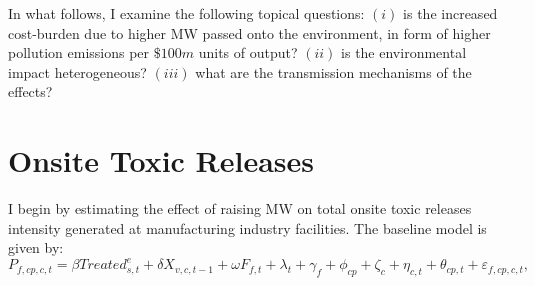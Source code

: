 \documentclass{C:/Users/david/OneDrive/Documents/ULMS/PhD/Thesis/chapter3/src/climate_change/latex/Economic_Journal/OUP-EJ}
\begin{document}
    In what follows, I examine the following topical questions: $(i)$ is the increased cost-burden due to higher MW passed onto the environment, in form of higher pollution emissions per $\$100m$ units of output? $(ii)$ is the environmental impact heterogeneous? $(iii)$ what are the transmission mechanisms of the effects?


    \section{Onsite Toxic Releases}\label{sec:onsite-toxic-releases}
    I begin by estimating the effect of raising MW on total onsite toxic releases intensity generated at manufacturing industry facilities. The baseline model is given by:
    \begin{equation}
        P_{f,cp,c,t} = \beta Treated_{s,t}^e + \delta X_{v,c,t-1} + \omega F_{f,t} + \lambda_{t} + \gamma_{f} + \phi_{cp} + \zeta_{c} + \eta_{c,t} + \theta_{cp,t} + \varepsilon_{f,cp,c,t},\label{eq:baseline-total-onsite-releases-intensity}
    \end{equation}
\end{document}
